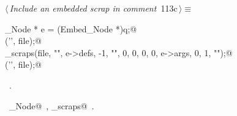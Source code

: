 \documentclass[a4paper]{report}
\begin{document}
\begin{flushleft} \small
\begin{minipage}{\linewidth}\label{scrap241}\raggedright\small
{} $\langle\,${\it Include an embedded scrap in comment}\nobreak\ {\footnotesize {113c}}$\,\rangle\equiv$
\vspace{-1ex}
\begin{list}{}{} \item
\mbox{}\verb@Embed_Node * e = (Embed_Node *)q;@\\
\mbox{}\verb@fputc('{', file);@\\
\mbox{}\verb@write_scraps(file, "", e->defs, -1, "", 0, 0, 0, 0, e->args, 0, 1, "");@\\
\mbox{}\verb@fputc('}', file);@{\NWsep}
\end{list}
\vspace{-1.5ex}
\footnotesize
\begin{list}{}{\setlength{\itemsep}{-\parsep}\setlength{\itemindent}{-\leftmargin}}
\item \NWtxtMacroRefIn\ .
\item \NWtxtIdentsUsed\nobreak\  \verb@Embed_Node@\nobreak\ , \verb@write_scraps@\nobreak\ .
\item{}
\end{list}
\end{minipage}\vspace{4ex}
\end{flushleft}
\end{document}
